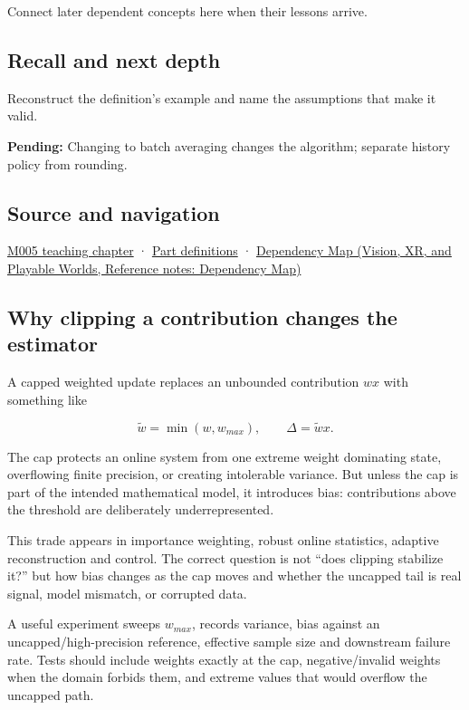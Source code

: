 \hypertarget{appendix-1e45d0613db3-used-by}{}

Connect later dependent concepts here when their lessons arrive.

\subsection{Recall and next depth}\label{appendix-1e45d0613db3-recall-and-next-depth}

\hypertarget{appendix-1e45d0613db3-recall-and-next-depth}{}

Reconstruct the definition's example and name the assumptions that make it valid.

\textbf{Pending:} Changing to batch averaging changes the algorithm; separate history policy from rounding.

\subsection{Source and navigation}\label{appendix-1e45d0613db3-source-and-navigation}

\hypertarget{appendix-1e45d0613db3-source-and-navigation}{}

\hyperref[01-foundations-i-ch001-when-arithmetic-meets-uncertainty]{M005 teaching chapter} · \hyperref[appendix-fd090d982a15-m005---parts-77-88]{Part definitions} · \href{../07-Vision-XR-and-Playable-Worlds/main.pdf\#nameddest=appendix-4ad47bdd269a}{Dependency Map (Vision, XR, and Playable Worlds, Reference notes: Dependency Map)}

\subsection{Why clipping a contribution changes the estimator}\label{appendix-1e45d0613db3-why-clipping-a-contribution-changes-the-estimator}

\hypertarget{appendix-1e45d0613db3-why-clipping-a-contribution-changes-the-estimator}{}

A capped weighted update replaces an unbounded contribution \(w x\) with something like

\[
\tilde w = \min(w,w_{max}),
\qquad
\Delta = \tilde w x.
\]

The cap protects an online system from one extreme weight dominating state, overflowing finite precision, or creating intolerable variance. But unless the cap is part of the intended mathematical model, it introduces bias: contributions above the threshold are deliberately underrepresented.

This trade appears in importance weighting, robust online statistics, adaptive reconstruction and control. The correct question is not ``does clipping stabilize it?'' but how bias changes as the cap moves and whether the uncapped tail is real signal, model mismatch, or corrupted data.

A useful experiment sweeps \(w_{max}\), records variance, bias against an uncapped/high-precision reference, effective sample size and downstream failure rate. Tests should include weights exactly at the cap, negative/invalid weights when the domain forbids them, and extreme values that would overflow the uncapped path.
